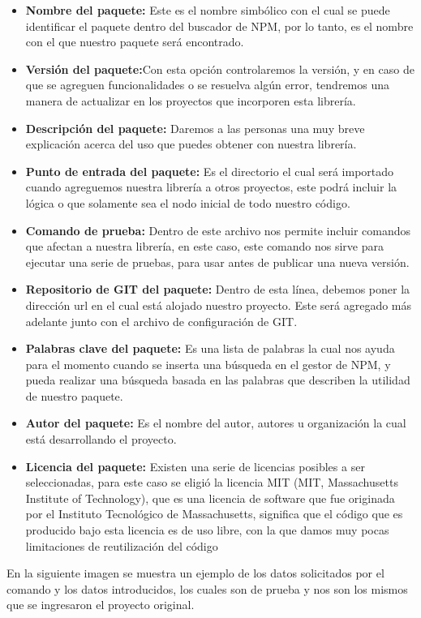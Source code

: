 \begin{itemize}
\item \textbf{Nombre del paquete:} Este es el nombre simbólico con el cual se puede identificar el paquete dentro del buscador de NPM, por lo tanto, es el nombre con el que nuestro paquete será encontrado.
\item \textbf{Versión del paquete:}Con esta opción controlaremos la versión, y en caso de que se agreguen funcionalidades o se resuelva algún error, tendremos una manera de actualizar en los proyectos que incorporen esta librería.
\item \textbf{Descripción del paquete: }Daremos a las personas una muy breve explicación acerca del uso que puedes obtener con nuestra librería.
\item \textbf{Punto de entrada del paquete:} Es el directorio el cual será importado cuando agreguemos nuestra librería a otros proyectos, este podrá incluir la lógica o que solamente sea el nodo inicial de todo nuestro código.
\item \textbf{Comando de prueba:} Dentro de este archivo nos permite incluir comandos que afectan a nuestra librería, en este caso, este comando nos sirve para ejecutar una serie de pruebas, para usar antes de publicar una nueva versión.
\item \textbf{Repositorio de GIT del paquete:} Dentro de esta línea, debemos poner la dirección url en el cual está alojado nuestro proyecto. Este será agregado más adelante junto con el archivo de configuración de GIT.
\item \textbf{Palabras clave del paquete:} Es una lista de palabras la cual nos ayuda para el momento cuando se inserta una búsqueda en el gestor de NPM, y pueda realizar una búsqueda basada en las palabras que describen la utilidad de nuestro paquete.
\item \textbf{Autor del paquete:} Es el nombre del autor, autores u organización la cual está desarrollando el proyecto.
\item \textbf{Licencia del paquete:} Existen una serie de licencias posibles a ser seleccionadas, para este caso se eligió la licencia MIT (MIT, Massachusetts Institute of Technology), que es una licencia de software que fue originada por el Instituto Tecnológico de Massachusetts, significa que el código que es producido bajo esta licencia es de uso libre, con la que damos muy pocas limitaciones de reutilización del código 
\end{itemize}
En la siguiente imagen se muestra un ejemplo de los datos solicitados por el comando y los datos introducidos, los cuales son de prueba y nos son los mismos que se ingresaron el proyecto original. 
